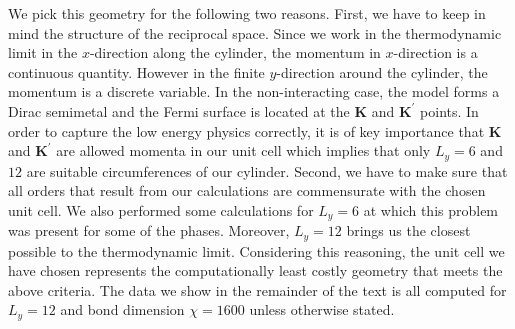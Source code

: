 \documentclass[aps,prx,10pt,twocolumn,floatfix,superscriptaddress,showpacs,numerical,footinbib]{revtex4-1}
\newcommand{\noteAG}[1]{{\color{blue} [AG: #1]}}
\begin{document}
We pick this geometry for the following two reasons.
%
First, 
%
%
we have to keep in mind the structure of the reciprocal space.
%
Since we work in the thermodynamic limit in the $x$-direction along the cylinder, the momentum in $x$-direction is a continuous quantity.
%
However in the finite $y$-direction around the cylinder, the momentum is a discrete variable.
%
In the non-interacting case, the model forms a Dirac semimetal and the Fermi surface is located at the 
$\mathbf{K}$ and $\mathbf{K}^{\prime}$ points.
%
%
In order to capture the low energy physics correctly, it is of key importance that $\mathbf{K}$ and $\mathbf{K}^{\prime}$ are allowed momenta in our unit cell which implies that only $L_y=6$ and $12$ are suitable circumferences of our cylinder.
%
Second, we have to make sure that all orders that result from our calculations are commensurate with the chosen unit cell.
%
We also performed some calculations for $L_y=6$ at which this problem was present for some of the phases.
%
Moreover, $L_y=12$ brings us the closest possible to the thermodynamic limit.
%
Considering this reasoning, the unit cell we have chosen represents the computationally least costly geometry that meets the above criteria.
%
The data we show in the remainder of the text is all computed for $L_y = 12$ and bond dimension $\chi = 1600$ unless otherwise stated.
\end{document}

